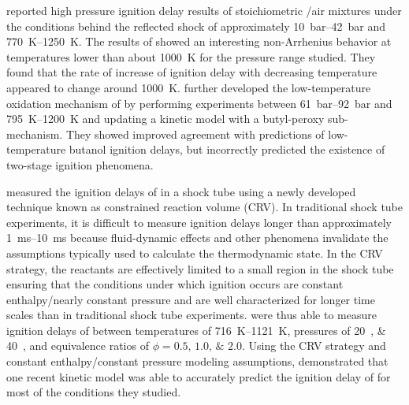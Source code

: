 \documentclass[../main.tex]{subfiles}
\begin{document}
\textcite{Heufer2011} reported high pressure ignition delay
results of stoichiometric \nBuOH{}/air mixtures under the
conditions behind the reflected shock of approximately \SIrange{10}{42}{\bar}
and \SIrange{770}{1250}{\kelvin}. The results of \textcite{Heufer2011}
showed an interesting non-Arrhenius behavior at
temperatures lower than about \SI{1000}{\kelvin} for the pressure range
studied. They found that the rate of increase of ignition delay with
decreasing temperature appeared to change around \SI{1000}{\kelvin}.
\textcite{Vranckx2011} further developed the low-temperature oxidation
mechanism of \nBuOH{} by performing experiments between
\SIrange{61}{92}{\bar} and \SIrange{795}{1200}{\kelvin} and updating
a kinetic model with a butyl-peroxy sub-mechanism. They showed improved
agreement with predictions of low-temperature butanol ignition delays,
but incorrectly predicted the existence of two-stage ignition phenomena.

\textcite{Zhu2014} measured the ignition delays of \nBuOH{}
in a shock tube using a newly developed technique known as constrained
reaction volume (CRV). In traditional shock tube experiments,
it is difficult to measure ignition delays longer than approximately
\SIrange{1}{10}{\milli\second} because fluid-dynamic effects and other
phenomena invalidate the assumptions typically used to calculate the
thermodynamic state. In the CRV strategy, the reactants are effectively
limited to a small region in the shock tube ensuring that the conditions
under which ignition occurs are constant enthalpy/nearly constant pressure
and are well characterized for longer time
scales than in traditional shock tube experiments. \textcite{Zhu2014}
were thus able to measure ignition delays of \nBuOH{} between
temperatures of \SIrange{716}{1121}{\kelvin}, pressures of
\SIlist{20;40}{\atmosphere}, and equivalence ratios of
$\phi = \numlist{0.5;1.0;2.0}$. Using the CRV strategy and constant
enthalpy/constant pressure modeling assumptions, \textcite{Zhu2014}
demonstrated that one recent kinetic model was able to accurately predict the
ignition delay of \nBuOH{} for most of the conditions
they studied.
\end{document}
